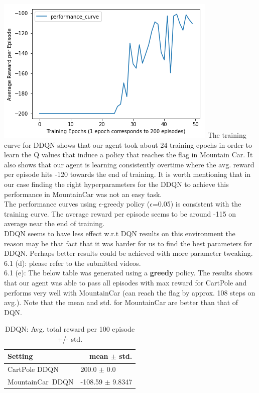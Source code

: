 \documentclass[12pt]{article}
\begin{document}
\begin{tcolorbox}[fit,height=22cm, width=\textwidth, blank, borderline={1pt}{-2pt},nobeforeafter]
    \includegraphics[width=.5\textwidth]{figures/MC_ddqn_performance_curve}
   	The training curve for DDQN shows that our agent took about 24 training epochs in order to learn the Q values that induce a policy that reaches the flag in Mountain Car. It also shows that our agent is learning consistently overtime where the avg. reward per episode hits -120 towards the end of training. It is worth mentioning that in our case finding the right hyperparameters for the DDQN to achieve this performance in MountainCar was not an easy task.  \\
    The performance curves using $\epsilon$-greedy policy ($\epsilon$=0.05) is consistent with the training curve. The average reward per episode seems to be around -115 on average near the end of training.   \\
    DDQN seems to have less effect w.r.t DQN results on this environment the reason may be that fact that it was harder for us to find the best parameters for DDQN. Perhaps better results could be achieved with more parameter tweaking.\\
    {\large 6.1 (d):} please refer to the submitted videos. \\
    {\large 6.1 (e):} The below table was generated using a \textbf{greedy} policy. The results shows that our agent was able to pass all episodes with max reward for CartPole and performs very well with $  $MountainCar (can reach the flag by approx. 108 steps on avg.). Note that the mean and std. for MountainCar are better than that of DQN.
    \vspace*{-0.6cm}
      \begin{table}[H]
    	\centering
    	\caption{ \footnotesize DDQN: Avg. total reward per 100 episode +/- std.}
    	\vspace*{-0.4cm}
    	\begin{tabular}{|p{9.43em}|r|}
    		\hline
    		\textbf{\footnotesize Setting} & \multicolumn{1}{p{10.645em}|}{\textbf{ \footnotesize mean $\pm$ std.}} \\
    		\hline
    		{\footnotesize CartPole DDQN} & \multicolumn{1}{l|}{\footnotesize 200.0 $\pm$ 0.0} \\
    		\hline
    		{\footnotesize MountainCar DDQN} & \multicolumn{1}{l|}{\footnotesize -108.59 $\pm$ 9.8347} \\
    		\hline
    	\end{tabular}%
    	\label{tabDDQN}%
    \end{table}%
    \end{tcolorbox}
\end{document}
